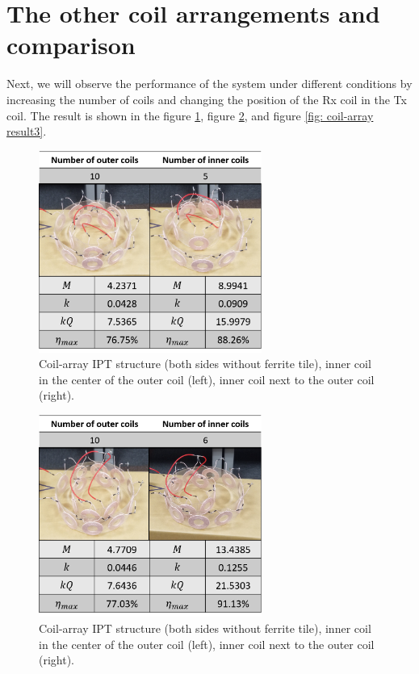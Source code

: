 \section{The other coil arrangements and comparison}
Next, we will observe the performance of the system under different conditions by increasing the number of coils and changing the position of the Rx coil in the Tx coil. The result is shown in the figure \ref{fig: coil-array result1}, figure \ref{fig: coil-array result2}, and figure \ref{fig: coil-array result3}.
\begin{figure}[!b]
    \centering
    \includegraphics[width=0.65\textwidth]{images/4_coil_5_10_without_ferrite.png}
    \caption{Coil-array IPT structure (both sides without ferrite tile), inner coil in the center of the outer coil (left), inner coil next to the outer coil (right).}
    \label{fig: coil-array result1}
\end{figure}
\begin{figure}[!t]
    \centering
    \includegraphics[width=0.65\textwidth]{images/4_coil_6_10_without_ferrite.png}
    \caption{Coil-array IPT structure (both sides without ferrite tile), inner coil in the center of the outer coil (left), inner coil next to the outer coil (right).}
    \label{fig: coil-array result2}
\end{figure}
